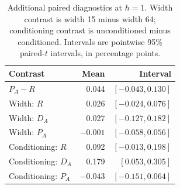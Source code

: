 \begin{table}[htbp]\centering\small
\caption{Additional paired diagnostics at $h=1$. Width contrast is width 15 minus width 64; conditioning contrast is unconditioned minus conditioned. Intervals are pointwise 95\% paired-$t$ intervals, in percentage points.}
\label{tab:diagnostic-supp}
\begin{tabular}{lrr}\toprule Contrast & Mean & Interval\\\midrule
$P_A-R$ &0.044&$[-0.043,0.130]$\\
Width: $R$ &0.026&$[-0.024,0.076]$\\
Width: $D_A$ &0.027&$[-0.127,0.182]$\\
Width: $P_A$ &$-0.001$&$[-0.058,0.056]$\\
Conditioning: $R$ &0.092&$[-0.013,0.198]$\\
Conditioning: $D_A$ &0.179&$[0.053,0.305]$\\
Conditioning: $P_A$ &$-0.043$&$[-0.151,0.064]$\\
\bottomrule\end{tabular}\end{table}
